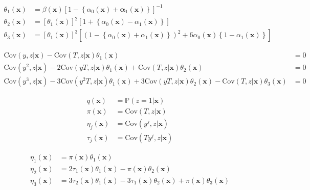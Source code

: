 \documentclass[12pt]{article}
\begin{document}
\begin{align}
  \label{eq:theta1_def}
  \theta_1(\mathbf{x}) &= \beta(\mathbf{x})\left[ 1 - \left\{ \alpha_0(\mathbf{x}) + \mathbf{\alpha}_1(\mathbf{x}) \right\} \right]^{-1}\\
  \label{eq:theta2_def}
  \theta_2(\mathbf{x}) &= \left[\theta_1(\mathbf{x})\right]^2 \left[ 1 + \left\{\alpha_0(\mathbf{x}) - \alpha_1(\mathbf{x})\right\}\right] \\
  \label{eq:theta3_def}
  \theta_3(\mathbf{x}) &= \left[\theta_1(\mathbf{x})\right]^3\left[ \left( 1 - \left\{\alpha_0(\mathbf{x}) + \alpha_1(\mathbf{x})\right\} \right)^2 + 6\alpha_0(\mathbf{x})\left\{ 1 - \alpha_1(\mathbf{x}) \right\} \right]
\end{align}

\begin{align*}
  \mbox{Cov}(y,z|\mathbf{x}) - \mbox{Cov}(T,z|\mathbf{x}) \theta_1(\mathbf{x}) &= 0\\
  \mbox{Cov}(y^2,z|\mathbf{x}) - 2\mbox{Cov}(yT,z|\mathbf{x}) \theta_1(\mathbf{x}) + \mbox{Cov}(T,z|\mathbf{x})\theta_2(\mathbf{x}) &= 0\\
  \mbox{Cov}(y^3,z|\mathbf{x}) - 3 \mbox{Cov}(y^2T,z|\mathbf{x}) \theta_1(\mathbf{x}) + 3\mbox{Cov}(yT,z|\mathbf{x}) \theta_2(\mathbf{x}) - \mbox{Cov}(T,z|\mathbf{x}) \theta_3(\mathbf{x})&= 0
\end{align*}

\begin{align*}
  q(\mathbf{x}) &= \mathbb{P}(z=1|\mathbf{x})\\
  \pi(\mathbf{x}) &= \mbox{Cov}(T,z|\mathbf{x})\\
  \eta_j(\mathbf{x}) &= \mbox{Cov}(y^j,z|\mathbf{x})\\
  \tau_j(\mathbf{x}) &= \mbox{Cov}(Ty^j,z|\mathbf{x})
\end{align*}

\begin{align*}
 \eta_1(\mathbf{x}) &= \pi(\mathbf{x})\theta_1(\mathbf{x}) \\
  \eta_2(\mathbf{x}) &=  2\tau_1(\mathbf{x}) \theta_1(\mathbf{x}) - \pi(\mathbf{x})\theta_2(\mathbf{x}) \\
  \eta_3(\mathbf{x}) &=  3\tau_2(\mathbf{x}) \theta_1(\mathbf{x}) - 3\tau_1(\mathbf{x}) \theta_2(\mathbf{x}) + \pi(\mathbf{x})\theta_3(\mathbf{x})
\end{align*}
\end{document}
